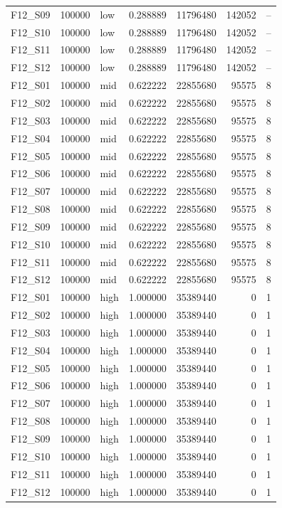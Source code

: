 \begin{longtable}{lllr r r r}
F12\_S09 & 100000 & low & 0.288889 & 11796480 & 142052 & -- \\
F12\_S10 & 100000 & low & 0.288889 & 11796480 & 142052 & -- \\
F12\_S11 & 100000 & low & 0.288889 & 11796480 & 142052 & -- \\
F12\_S12 & 100000 & low & 0.288889 & 11796480 & 142052 & -- \\
F12\_S01 & 100000 & mid & 0.622222 & 22855680 & 95575 & 8 \\
F12\_S02 & 100000 & mid & 0.622222 & 22855680 & 95575 & 8 \\
F12\_S03 & 100000 & mid & 0.622222 & 22855680 & 95575 & 8 \\
F12\_S04 & 100000 & mid & 0.622222 & 22855680 & 95575 & 8 \\
F12\_S05 & 100000 & mid & 0.622222 & 22855680 & 95575 & 8 \\
F12\_S06 & 100000 & mid & 0.622222 & 22855680 & 95575 & 8 \\
F12\_S07 & 100000 & mid & 0.622222 & 22855680 & 95575 & 8 \\
F12\_S08 & 100000 & mid & 0.622222 & 22855680 & 95575 & 8 \\
F12\_S09 & 100000 & mid & 0.622222 & 22855680 & 95575 & 8 \\
F12\_S10 & 100000 & mid & 0.622222 & 22855680 & 95575 & 8 \\
F12\_S11 & 100000 & mid & 0.622222 & 22855680 & 95575 & 8 \\
F12\_S12 & 100000 & mid & 0.622222 & 22855680 & 95575 & 8 \\
F12\_S01 & 100000 & high & 1.000000 & 35389440 & 0 & 1 \\
F12\_S02 & 100000 & high & 1.000000 & 35389440 & 0 & 1 \\
F12\_S03 & 100000 & high & 1.000000 & 35389440 & 0 & 1 \\
F12\_S04 & 100000 & high & 1.000000 & 35389440 & 0 & 1 \\
F12\_S05 & 100000 & high & 1.000000 & 35389440 & 0 & 1 \\
F12\_S06 & 100000 & high & 1.000000 & 35389440 & 0 & 1 \\
F12\_S07 & 100000 & high & 1.000000 & 35389440 & 0 & 1 \\
F12\_S08 & 100000 & high & 1.000000 & 35389440 & 0 & 1 \\
F12\_S09 & 100000 & high & 1.000000 & 35389440 & 0 & 1 \\
F12\_S10 & 100000 & high & 1.000000 & 35389440 & 0 & 1 \\
F12\_S11 & 100000 & high & 1.000000 & 35389440 & 0 & 1 \\
F12\_S12 & 100000 & high & 1.000000 & 35389440 & 0 & 1 \\
\bottomrule
\end{longtable}
